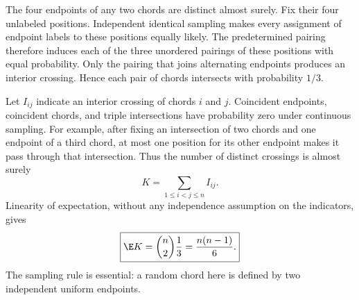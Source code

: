The four endpoints of any two chords are distinct almost surely. Fix their four unlabeled positions. Independent identical sampling makes every assignment of endpoint labels to these positions equally likely. The predetermined pairing therefore induces each of the three unordered pairings of these positions with equal probability. Only the pairing that joins alternating endpoints produces an interior crossing. Hence each pair of chords intersects with probability $1/3$.

Let $I_{ij}$ indicate an interior crossing of chords $i$ and $j$. Coincident endpoints, coincident chords, and triple intersections have probability zero under continuous sampling. For example, after fixing an intersection of two chords and one endpoint of a third chord, at most one position for its other endpoint makes it pass through that intersection. Thus the number of distinct crossings is almost surely
\[
K=\sum_{1\le i<j\le n}I_{ij}.
\]
Linearity of expectation, without any independence assumption on the indicators, gives
\[
\boxed{\E K=\binom n2\frac13=\frac{n(n-1)}6.}
\]
The sampling rule is essential: a random chord here is defined by two independent uniform endpoints.
